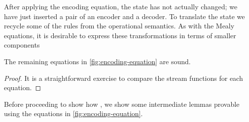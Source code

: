 After applying the encoding equation, the state has not actually changed; we
have just inserted a pair of an encoder and a decoder.
To translate the state we recycle some of the rules from the operational
semantics.
As with the Mealy equations, it is desirable to express these transformations in
terms of smaller components

\begin{lemma}
    The remaining equations in \cref{fig:encoding-equation} are sound.
\end{lemma}
\begin{proof}
    It is a straightforward exercise to compare the stream functions for each
    equation.
\end{proof}

Before proceeding to show how , we show some intermediate lemmas provable using
the equations in \cref{fig:encoding-equation}.

